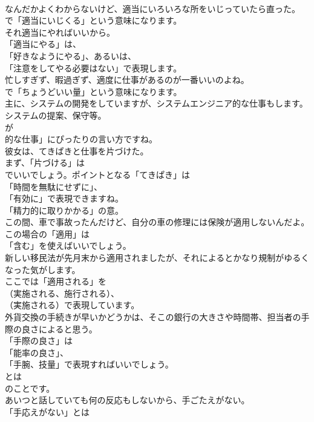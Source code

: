 \documentclass[8pt]{extreport}
\begin{document}
\begin{CJK}{UTF8}{min}
\\	なんだかよくわからないけど、適当にいろいろな所をいじっていたら直った。 
\\	で「適当にいじくる」という意味になります。	
\\	それ適当にやればいいから。 
\\	「適当にやる」は、
\\	「好きなようにやる」、あるいは、
\\	「注意をしてやる必要はない」で表現します。	
\\	忙しすぎず、暇過ぎず、適度に仕事があるのが一番いいのよね。 
\\	で「ちょうどいい量」という意味になります。	
\\	主に、システムの開発をしていますが、システムエンジニア的な仕事もします。システムの提案、保守等。 
\\	が
\\	的な仕事」にぴったりの言い方ですね。	
\\	彼女は、てきぱきと仕事を片づけた。 
\\	まず、「片づける」は
\\	でいいでしょう。ポイントとなる「てきぱき」は
\\	「時間を無駄にせずに」、
\\	「有効に」で表現できますね。
\\	「精力的に取りかかる」の意。	
\\	この間、車で事故ったんだけど、自分の車の修理には保険が適用しないんだよ。 
\\	この場合の「適用」は
\\	「含む」を使えばいいでしょう。	
\\	新しい移民法が先月末から適用されましたが、それによるとかなり規制がゆるくなった気がします。 
\\	ここでは「適用される」を 
\\	（実施される、施行される）、
\\	（実施される）で表現しています。	
\\	外貨交換の手続きが早いかどうかは、そこの銀行の大きさや時間帯、担当者の手際の良さによると思う。 
\\	「手際の良さ」は
\\	「能率の良さ」、
\\	「手腕、技量」で表現すればいいでしょう。
\\	とは
\\	のことです。	
\\	あいつと話していても何の反応もしないから、手ごたえがない。 
\\	「手応えがない」とは

\end{CJK}
\end{document}
